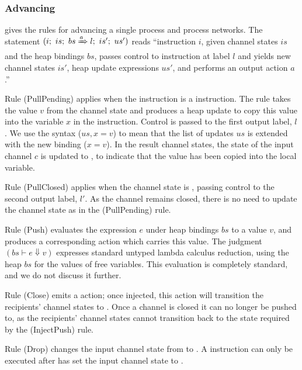 


\subsubsection{Advancing}
 gives the rules for advancing a single process and process networks.
The statement $(i;~is;~bs \xRightarrow{a} l;~is';~us')$ reads ``instruction $i$, given channel states $is$ and the heap bindings $bs$, passes control to instruction at label $l$ and yields new channel states $is'$, heap update expressions $us'$, and performs an output action $a$.''

Rule (PullPending) applies when the instruction is a \lstiproc@pull@ instruction.
The rule takes the \lstiproc@pending@ value $v$ from the channel state and produces a heap update to copy this value into the variable $x$ in the \lstiproc@pull@ instruction.
Control is passed to the first output label, $l$.
We use the syntax ($us,x=v$) to mean that the list of updates $us$ is extended with the new binding ($x=v$).
In the result channel states, the state of the input channel $c$ is updated to \lstiproc@have@, to indicate that the value has been copied into the local variable.

Rule (PullClosed) applies when the channel state is \lstiproc@closed@, passing control to the second output label, $l'$.
As the channel remains closed, there is no need to update the channel state as in the (PullPending) rule.

Rule (Push) evaluates the expression $e$ under heap bindings $bs$ to a value $v$, and produces a corresponding action which carries this value.
The judgment $(bs \vdash e \Downarrow v)$ expresses standard untyped lambda calculus reduction, using the heap $bs$ for the values of free variables.
This evaluation is completely standard, and we do not discuss it further.

Rule (Close) emits a \lstiproc@close@ action; once injected, this action will transition the recipients' channel states to \lstiproc@closed@.
Once a channel is closed it can no longer be pushed to, as the recipients' channel states cannot transition back to the \lstiproc@none@ state required by the (InjectPush) rule.

Rule (Drop) changes the input channel state from \lstiproc@have@ to \lstiproc@none@. A \lstiproc@drop@ instruction can only be executed after \lstiproc@pull@ has set the input channel state to \lstiproc@have@.

